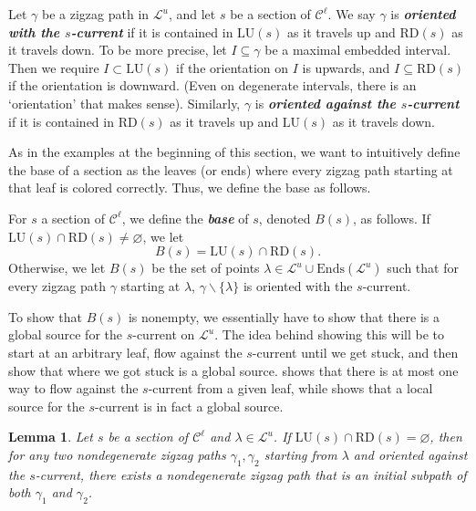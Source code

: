 \documentclass[11pt]{amsart}
\renewcommand{\l}{\lambda}
\newcommand{\mc}{\mathcal}
\newcommand\ssm{\smallsetminus}
\newcommand{\defn}[1]{\textbf{\emph{#1}}}
\newcommand{\lu}{\mathrm{LU}}
\newcommand{\rd}{\mathrm{RD}}
\newcommand{\Ends}{\mathrm{Ends}}
\numberwithin{equation}{section}
\newtheorem{lemma}[equation]{Lemma}
\theoremstyle{definition}
\begin{document}
\begin{definition}\label{def:current}
	Let $\gamma$ be a zigzag path in $\mc L^u$, and let $s$ be a section of $\mc C^\ell$. We say $\gamma$ is \defn{oriented with the $s$-current} if it is contained in $\lu(s)$ as it travels up and $\rd(s)$ as it travels down. To be more precise, let $I\subseteq\gamma$ be a maximal embedded interval. Then we require $I\subset\lu(s)$ if the orientation on $I$ is upwards, and $I\subseteq\rd(s)$ if the orientation is downward. (Even on degenerate intervals, there is an `orientation' that makes sense). Similarly, $\gamma$ is \defn{oriented against the $s$-current} if it is contained in $\rd(s)$ as it travels up and $\lu(s)$ as it travels down.
\end{definition}

As in the examples at the beginning of this section, we want to intuitively define the base of a section as the leaves (or ends) where every zigzag path starting at that leaf is colored correctly. Thus, we define the base as follows.

\begin{definition}\label{def:B}
	For $s$ a section of $\mc C^\ell$, we define the \defn{base} of $s$, denoted $B(s)$, as follows. If $\lu(s)\cap\rd(s)\neq\varnothing$, we let 
	\[
	B(s)=\lu(s)\cap\rd(s).
	\] 
	Otherwise, we let $B(s)$ be the set of points $\lambda\in\mc L^u\cup\Ends(\mc L^u)$ such that for every zigzag path $\gamma$ starting at $\lambda$, $\gamma\ssm\{\l\}$ is oriented with the $s$-current. 
\end{definition}



To show that $B(s)$ is nonempty, we essentially have to show that there is a global source for the $s$-current on $\mc L^u$. The idea behind showing this will be to start at an arbitrary leaf, flow against the $s$-current until we get stuck, and then show that where we got stuck is a global source.  shows that there is at most one way to flow against the $s$-current from a given leaf, while  shows that a local source for the $s$-current is in fact a global source.

\begin{lemma}\label{lem:no_sink_local}
	Let $s$ be a section of $\mc C^\ell$ and $\lambda\in\mc L^u$. If $\lu(s)\cap\rd(s)=\varnothing$, then for any two nondegenerate zigzag paths $\gamma_1,\gamma_2$ starting from $\l$ and oriented against the $s$-current, there exists a nondegenerate zigzag path that is an initial subpath of both $\gamma_1$ and $\gamma_2$.
	
	

\end{lemma}
\end{document}

